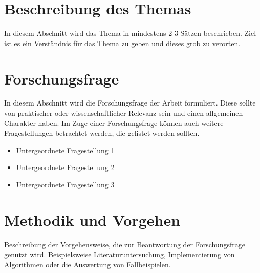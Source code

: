 %

\section*{Beschreibung des Themas}
In diesem Abschnitt wird das Thema in mindestens 2-3 Sätzen beschrieben. 
Ziel ist es ein Verständnis für das Thema zu geben und dieses grob zu verorten.

\section*{Forschungsfrage}
In diesem Abschnitt wird die Forschungsfrage der Arbeit formuliert. 
Diese sollte von praktischer oder wissenschaftlicher Relevanz sein und einen allgemeinen Charakter haben.
Im Zuge einer Forschungsfrage können auch weitere Fragestellungen betrachtet werden, die gelistet werden sollten. 
\begin{itemize}
    \item Untergeordnete Fragestellung 1
    \item Untergeordnete Fragestellung 2
    \item Untergeordnete Fragestellung 3
\end{itemize}

\section*{Methodik und Vorgehen}
Beschreibung der Vorgehensweise, die zur Beantwortung der Forschungsfrage genutzt wird. 
Beispielsweise Literaturuntersuchung, Implementierung von Algorithmen oder die Auswertung von Fallbeispielen.

\pagebreak
